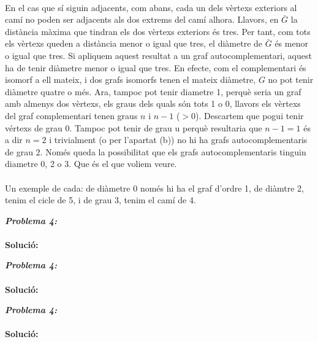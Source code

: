 \documentclass[10pt]{article}
\begin{document}
\begin{itemize}
 \\
\justify
En el cas que sí siguin adjacents, com abans, cada un dels vèrtexs exteriors al camí no poden ser adjacents als dos extrems del camí alhora. Llavors, en $\bar{G}$ la distància màxima que tindran els dos vèrtexs exteriors és tres. Per tant, com tots els vèrtexs queden a distància menor o igual que tres, el diàmetre de $\bar{G}$ és menor o igual que tres. Si apliquem aquest resultat a un graf autocomplementari, aquest ha de tenir diàmetre menor o igual que tres. En efecte, com el complementari és isomorf a ell mateix, i dos grafs isomorfs tenen el mateix diàmetre, $G$ no pot tenir diàmetre quatre o més. Ara, tampoc pot tenir diametre 1, perquè seria un graf amb almenys dos vèrtexs, els graus dels quals són tots 1 o 0, llavors els vèrtexs del graf complementari tenen graus $n$ i $n-1$ ($>0$). Descartem que pogui tenir vértexs de grau 0. Tampoc pot tenir de grau u perquè resultaria que $n-1=1$ és a dir $n=2$ i trivialment (o per l'apartat (b)) no hi ha grafs autocomplementaris de grau 2. Només queda la possibilitat que els grafs autocomplementaris tinguin diametre 0, 2 o 3. Que és el que voliem veure. \\ \\
Un exemple de cada: de diàmetre 0 només hi ha el graf d'ordre 1, de diàmtre 2, tenim el cicle de 5, i de grau 3, tenim el camí de 4.

\end{itemize}

\large
\textsl{\textbf{Problema 4:}} \\ \\
\textbf{Solució:} \\
\normalsize

\large
\textsl{\textbf{Problema 4:}} \\ \\
\textbf{Solució:} \\
\normalsize

\large
\textsl{\textbf{Problema 4:}} \\ \\
\textbf{Solució:} \\
\normalsize
\end{document}
